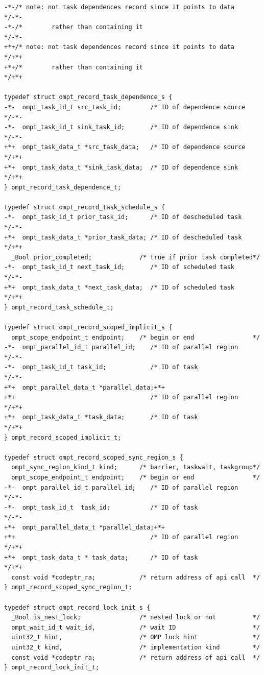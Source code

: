 \documentclass{article}
\begin{document}
\begin{lstlisting}
-*-/* note: not task dependences record since it points to data       */-*-
-*-/*        rather than containing it                                */-*-
+*+/* note: not task dependences record since it points to data        */+*+
+*+/*        rather than containing it                                 */+*+

typedef struct ompt_record_task_dependence_s {
-*-  ompt_task_id_t src_task_id;        /* ID of dependence source     */-*-
-*-  ompt_task_id_t sink_task_id;       /* ID of dependence sink       */-*-
+*+  ompt_task_data_t *src_task_data;   /* ID of dependence source     */+*+
+*+  ompt_task_data_t *sink_task_data;  /* ID of dependence sink       */+*+
} ompt_record_task_dependence_t;

typedef struct ompt_record_task_schedule_s {
-*-  ompt_task_id_t prior_task_id;      /* ID of descheduled task      */-*-
+*+  ompt_task_data_t *prior_task_data; /* ID of descheduled task      */+*+
  _Bool prior_completed;             /* true if prior task completed*/
-*-  ompt_task_id_t next_task_id;       /* ID of scheduled task        */-*-
+*+  ompt_task_data_t *next_task_data;  /* ID of scheduled task        */+*+
} ompt_record_task_schedule_t;

typedef struct ompt_record_scoped_implicit_s {
  ompt_scope_endpoint_t endpoint;    /* begin or end                */
-*-  ompt_parallel_id_t parallel_id;    /* ID of parallel region       */-*-
-*-  ompt_task_id_t task_id;            /* ID of task                  */-*-
+*+  ompt_parallel_data_t *parallel_data;+*+
+*+                                     /* ID of parallel region       */+*+
+*+  ompt_task_data_t *task_data;       /* ID of task                  */+*+
} ompt_record_scoped_implicit_t;

typedef struct ompt_record_scoped_sync_region_s {
  ompt_sync_region_kind_t kind;      /* barrier, taskwait, taskgroup*/
  ompt_scope_endpoint_t endpoint;    /* begin or end                */ 
-*-  ompt_parallel_id_t parallel_id;    /* ID of parallel region       */-*-
-*-  ompt_task_id_t  task_id;           /* ID of task                  */-*-
+*+  ompt_parallel_data_t *parallel_data;+*+
+*+                                     /* ID of parallel region       */+*+
+*+  ompt_task_data_t * task_data;      /* ID of task                  */+*+
  const void *codeptr_ra;            /* return address of api call  */
} ompt_record_scoped_sync_region_t;

typedef struct ompt_record_lock_init_s {
  _Bool is_nest_lock;                /* nested lock or not          */
  ompt_wait_id_t wait_id,            /* wait ID                     */
  uint32_t hint,                     /* OMP lock hint               */
  uint32_t kind,                     /* implementation kind         */
  const void *codeptr_ra;            /* return address of api call  */          
} ompt_record_lock_init_t;


\end{lstlisting}
\end{document}
